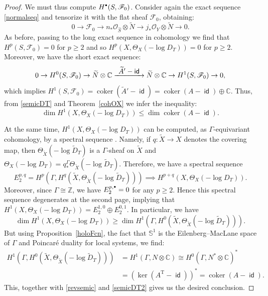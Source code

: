 \documentclass[JEP,XML,SOM,Unicode,NoFloatCountersInSection]{cedram}
\let\mathcal\mathscr
\theoremstyle{definition}
\newcommand{\sbullet}{{\raisebox{1pt}{$\scriptscriptstyle\bullet$}}}
\let\wt\widetilde
\newcommand{\To}[1]{\mathchoice{\xrightarrow{\textstyle\kern4pt#1\kern3pt}}{\stackrel{#1}{\longrightarrow}}{}{}}
\newcommand{\CC}{\mathbb{C}}
\newcommand{\Ss}{\mathbb{S}}
\newcommand{\ZZ}{\mathbb{Z}}
\newcommand{\Oo}{\mathcal{O}}
\DeclareMathOperator{\coker}{coker}
\DeclareMathOperator{\id}{\mathsf{id}}
\newcommand{\transp}[1]{{#1}^{\scriptscriptstyle\mathrm{T}}}
\begin{document}
\begin{proof}
We must thus compute $H^\sbullet(S,\mathcal F_0)$. Consider again the exact sequence \eqref{normalseq} and tensorize it with the flat sheaf $\mathcal F_0$, obtaining:
\begin{equation*}
0\to \mathcal F_0\to n_*\Oo_{\hat{S}}\otimes\wt{N} \to j_*\Oo_Y\otimes \wt{N}\to 0.
\end{equation*}
As before, passing to the long exact sequence in cohomology we find that~\hbox{$H^p(S,\mathcal F_0)\!=\!0$} for $p\geq 2$ and so $H^p(X,\Theta_X(-\log D_T))=0$ for $p\geq 2$. Moreover, we have the short exact sequence:
\begin{equation*}
0\to H^0(S,\mathcal F_0)\to \wt{N}\otimes\CC\To{\wt{A}'-\id} \wt{N}\otimes\CC\to H^1(S,\mathcal F_0)\to 0,
\end{equation*}
which implies $H^1(S,\mathcal F_0)=\coker(\wt{A}'-\id)=\coker (A-\id)\oplus\CC$. Thus, from \eqref{semicDT} and Theorem~\ref{cohOX} we infer the inequality:
\begin{equation}\label{semicDT2}
\dim H^1(X,\Theta_X(-\log D_T))\leq\dim\coker(A-\id).
\end{equation}

At the same time, $H^1(X,\Theta_X(-\log D_T))$ can be computed, as $\Gamma$-equivariant cohomology, by a spectral sequence \cite[\S5.2]{gr}. Namely, if $q:\wt{X}\to X$ denotes the covering map, then $\Theta_{\wt{X}}(-\log\wt{D}_T)$ is a $\Gamma$-sheaf on $\wt{X}$ and $\Theta_X(-\log D_T)=q_*^\Gamma\Theta_{\wt{X}}(-\log\wt{D}_T)$. Therefore, we have a spectral sequence
\begin{equation*}
E^{p,q}_2=H^p(\Gamma,H^q(\wt{X},\Theta_{\wt{X}}(-\log \wt{D}_T)))\implies H^{p+q}(X,\Theta_X(-\log D_T)).
\end{equation*}
Moreover, since $\Gamma\cong\ZZ$, we have $E_2^{p,\sbullet}=0$ for any $p\geq 2$. Hence this spectral sequence degenerates at the second page, implying that $H^1(X,\Theta_X(-\log D_T))=E_2^{1,0}\oplus E_2^{0,1}$. In particular, we have
\begin{equation}\label{revsemic}
\dim H^1(X,\Theta_X(-\log D_T))\geq \dim H^1(\Gamma,H^0(\wt{X},\Theta_{\wt{X}}(-\log\wt{D}_T))).
\end{equation}
But using Proposition~\ref{holoFcn}, the fact that $\Ss^1$ is the Eilenberg–MacLane space of $\Gamma$ and Poincaré duality for local systems, we find:
\begin{align*}
H^1(\Gamma,H^0(\wt{X},\Theta_{\wt{X}}(-\log\wt{D}_T)))&=H^1(\Gamma,N\otimes\CC)\cong H^0(\Gamma,N^*\otimes\CC)^*\\
&=(\ker(\transp{A}-\id))^*=\coker (A-\id) .
\end{align*}
This, together with \eqref{revsemic} and \eqref{semicDT2} gives us the desired conclusion.
\end{proof}
\end{document}
